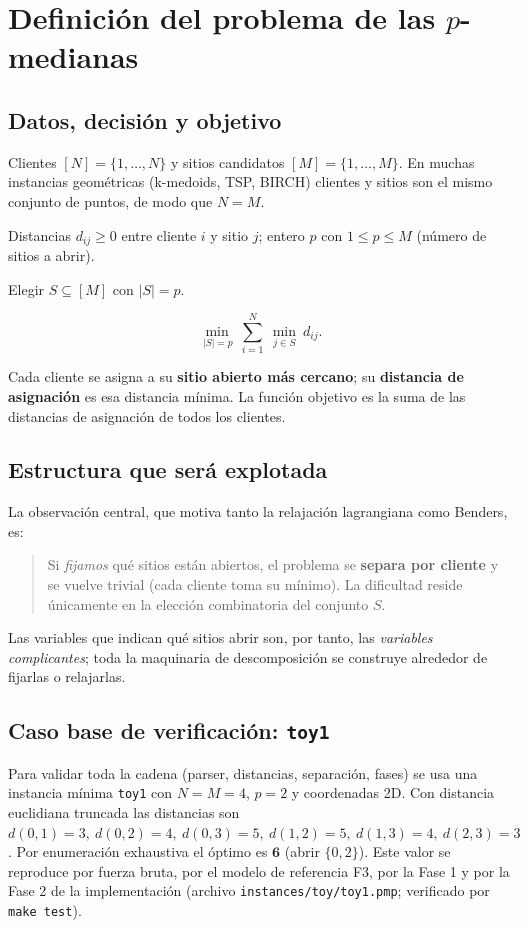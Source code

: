 \section{Definición del problema de las \texorpdfstring{$p$}{p}-medianas}
\label{sec:definicion}

\subsection{Datos, decisión y objetivo}
\begin{description}[leftmargin=1.5em]
  \item[Conjuntos.] Clientes $[N]=\{1,\dots,N\}$ y sitios candidatos $[M]=\{1,\dots,M\}$. En
        muchas instancias geométricas (k-medoids, TSP, BIRCH) clientes y sitios son el mismo
        conjunto de puntos, de modo que $N=M$.
  \item[Parámetros.] Distancias $d_{ij}\ge 0$ entre cliente $i$ y sitio $j$; entero $p$ con
        $1\le p\le M$ (número de sitios a abrir).
  \item[Decisión.] Elegir $S\subseteq[M]$ con $|S|=p$.
  \item[Objetivo.]
        \[
          \min_{\,|S|=p}\ \sum_{i=1}^{N}\ \min_{j\in S}\ d_{ij}.
        \]
\end{description}

Cada cliente se asigna a su \textbf{sitio abierto más cercano}; su \textbf{distancia de
asignación} es esa distancia mínima. La función objetivo es la suma de las distancias de
asignación de todos los clientes.

\subsection{Estructura que será explotada}
La observación central, que motiva tanto la relajación lagrangiana como Benders, es:

\begin{quote}
Si \emph{fijamos} qué sitios están abiertos, el problema se \textbf{separa por cliente} y se
vuelve trivial (cada cliente toma su mínimo). La dificultad reside únicamente en la elección
combinatoria del conjunto $S$.
\end{quote}

Las variables que indican qué sitios abrir son, por tanto, las \emph{variables complicantes};
toda la maquinaria de descomposición se construye alrededor de fijarlas o relajarlas.

\subsection{Caso base de verificación: \texttt{toy1}}
Para validar toda la cadena (parser, distancias, separación, fases) se usa una instancia mínima
\texttt{toy1} con $N=M=4$, $p=2$ y coordenadas 2D. Con distancia euclidiana truncada las
distancias son $d(0,1)=3,\ d(0,2)=4,\ d(0,3)=5,\ d(1,2)=5,\ d(1,3)=4,\ d(2,3)=3$. Por
enumeración exhaustiva el óptimo es $\mathbf{6}$ (abrir $\{0,2\}$). Este valor se reproduce por
fuerza bruta, por el modelo de referencia F3, por la Fase 1 y por la Fase 2 de la implementación
(archivo \texttt{instances/toy/toy1.pmp}; verificado por \texttt{make test}).
